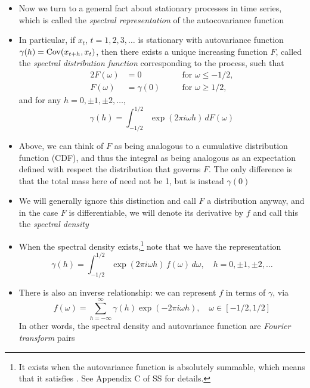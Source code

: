 \documentclass{article}
\begin{document}
\begin{itemize}
\item Now we turn to a general fact about stationary processes in time series,
  which is called the \emph{spectral representation} of the autocovariance
  function

\item In particular, if $x_t$, $t = 1,2,3,\dots$ is stationary with autovariance
  function $\gamma(h) = \operatorname{Cov}(x_{t+h}, x_t)$, then there exists a unique
  increasing function $F$, called the \emph{spectral distribution function}
  corresponding to the process, such that  
  \begin{alignat*}{2}
  F(\omega) &= 0 \quad && \text{for $\omega \leq -1/2$}, \\
  F(\omega) &= \gamma(0) \quad && \text{for $\omega \geq 1/2$}, 
  \end{alignat*}
  and for any $h = 0, \pm 1, \pm 2, \dots$,
  \[
  \gamma(h) = \int_{-1/2}^{1/2} \exp(2\pi i \omega h) \, dF(\omega) 
  \]

\item Above, we can think of $F$ as being analogous to a cumulative distribution
  function (CDF), and thus the integral as being analogous as an expectation
  defined with respect the distribution that governs $F$. The only difference is
  that the total mass here of need not be 1, but is instead $\gamma(0)$ 

\item We will generally ignore this distinction and call $F$ a distribution
  anyway, and in the case $F$ is differentiable, we will denote its derivative
  by $f$ and call this the \emph{spectral density}

\item When the spectral density exists,\footnote{It exists when the autovariance
    function is absolutely summable, which means that it satisfies
    . See Appendix C of SS
    for details.} 
  note that we have the representation 
  \[
  \gamma(h) = \int_{-1/2}^{1/2} \exp(2\pi i \omega h) \, f(\omega) \, d\omega,
  \quad h = 0, \pm 1, \pm 2, \dots
  \]

\item There is also an inverse relationship: we can represent $f$ in terms of
  $\gamma$, via 
  \[
  f(\omega) = \sum_{h=-\infty}^\infty \gamma(h) \exp(-2\pi i \omega h), \quad
  \omega \in [-1/2, 1/2] 
  \]
  In other words, the spectral density and autovariance function are
  \emph{Fourier transform} pairs


\end{itemize}
\end{document}

